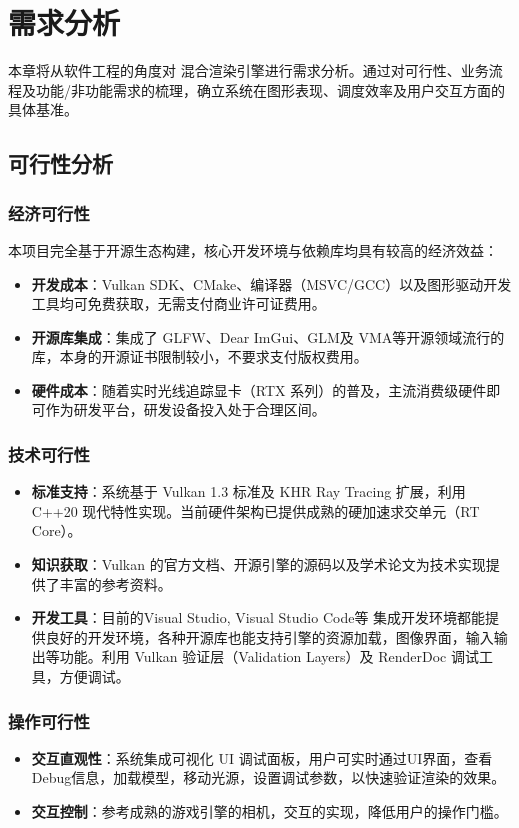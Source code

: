 
\chapter{需求分析}
\label{chap:requirements}

本章将从软件工程的角度对 混合渲染引擎进行需求分析。通过对可行性、业务流程及功能/非功能需求的梳理，确立系统在图形表现、调度效率及用户交互方面的具体基准。

\section{可行性分析}

\subsection{经济可行性}
本项目完全基于开源生态构建，核心开发环境与依赖库均具有较高的经济效益：
\begin{itemize}
    \item \textbf{开发成本}：Vulkan SDK、CMake、编译器（MSVC/GCC）以及图形驱动开发工具均可免费获取，无需支付商业许可证费用。
    \item \textbf{开源库集成}：集成了 GLFW、Dear ImGui、GLM及 VMA等开源领域流行的库，本身的开源证书限制较小，不要求支付版权费用。
    \item \textbf{硬件成本}：随着实时光线追踪显卡（RTX 系列）的普及，主流消费级硬件即可作为研发平台，研发设备投入处于合理区间。
\end{itemize}

\subsection{技术可行性}
\begin{itemize}
    \item \textbf{标准支持}：系统基于 Vulkan 1.3 标准及 KHR Ray Tracing 扩展，利用 C++20 现代特性实现。当前硬件架构已提供成熟的硬加速求交单元（RT Core）。
    \item \textbf{知识获取}：Vulkan 的官方文档、开源引擎的源码以及学术论文为技术实现提供了丰富的参考资料。
    \item \textbf{开发工具}：目前的Visual Studio, Visual Studio Code等 集成开发环境都能提供良好的开发环境，各种开源库也能支持引擎的资源加载，图像界面，输入输出等功能。利用 Vulkan 验证层（Validation Layers）及 RenderDoc 调试工具，方便调试。
\end{itemize}

\subsection{操作可行性}
\begin{itemize}
    \item \textbf{交互直观性}：系统集成可视化 UI 调试面板，用户可实时通过UI界面，查看Debug信息，加载模型，移动光源，设置调试参数，以快速验证渲染的效果。
    \item \textbf{交互控制}：参考成熟的游戏引擎的相机，交互的实现，降低用户的操作门槛。
\end{itemize}

